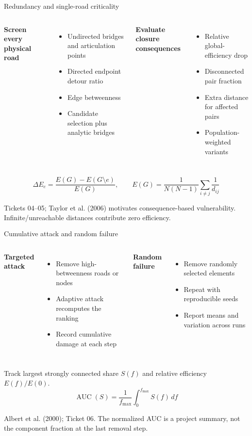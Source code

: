 \documentclass[11pt,aspectratio=169]{beamer}
\newcommand{\src}[1]{\vfill{\fontsize{7.5}{9}\selectfont\color{Muted}#1\par}}
\newcommand{\smallitems}{\setlength{\itemsep}{1.5mm}}
\begin{document}
\begin{frame}{Redundancy and single-road criticality}
\begin{columns}[T,totalwidth=\textwidth]
\textbf{Screen every physical road}
\begin{itemize}\smallitems
\item Undirected bridges and articulation points
\item Directed endpoint detour ratio
\item Edge betweenness
\item Candidate selection plus analytic bridges
\end{itemize}
\textbf{Evaluate closure consequences}
\begin{itemize}\smallitems
\item Relative global-efficiency drop
\item Disconnected pair fraction
\item Extra distance for affected pairs
\item Population-weighted variants
\end{itemize}
\end{columns}
\vspace{2mm}
\[
\Delta E_e=\frac{E(G)-E(G\setminus e)}{E(G)},\qquad
E(G)=\frac{1}{N(N-1)}\sum_{i\ne j}\frac{1}{d_{ij}}
\]
\src{Tickets 04--05; Taylor et al. (2006) motivates consequence-based vulnerability. Infinite/unreachable distances contribute zero efficiency.}
\end{frame}

\begin{frame}{Cumulative attack and random failure}
\begin{columns}[T,totalwidth=\textwidth]
\textbf{Targeted attack}
\begin{itemize}\smallitems
\item Remove high-betweenness roads or nodes
\item Adaptive attack recomputes the ranking
\item Record cumulative damage at each step
\end{itemize}
\textbf{Random failure}
\begin{itemize}\smallitems
\item Remove randomly selected elements
\item Repeat with reproducible seeds
\item Report means and variation across runs
\end{itemize}
\end{columns}
\vspace{2mm}
Track largest strongly connected share $S(f)$ and relative efficiency $E(f)/E(0)$.
\[
\operatorname{AUC}(S)=\frac{1}{f_{\max}}\int_0^{f_{\max}}S(f)\,df
\]
\src{Albert et al. (2000); Ticket 06. The normalized AUC is a project summary, not the component fraction at the last removal step.}
\end{frame}
\end{document}

